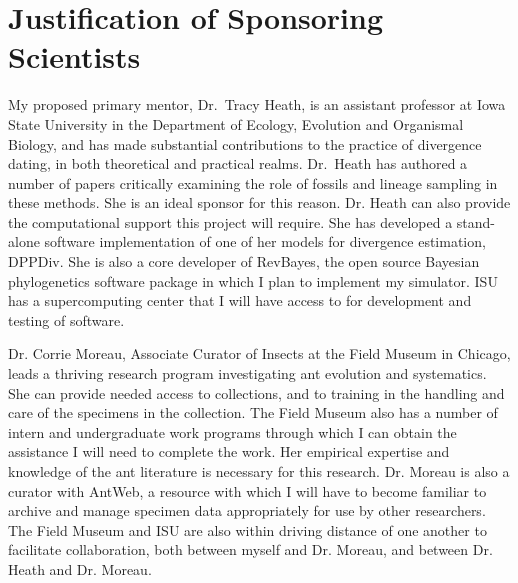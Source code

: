 \documentclass[]{article}
\begin{document}
\section*{Justification of Sponsoring Scientists}
    My proposed primary mentor, Dr.\ Tracy Heath, is an assistant professor at Iowa State University in the Department of Ecology, Evolution and Organismal Biology, and has made substantial contributions to the practice of divergence dating, in both theoretical and practical realms. Dr.\ Heath has authored a number of papers critically examining the role of fossils and lineage sampling in these methods. She is an ideal sponsor for this reason. Dr. Heath can also provide the computational support this project will require. She has developed a stand-alone software implementation of one of her models for divergence estimation, DPPDiv. She is also a core developer of RevBayes, the open source Bayesian phylogenetics software package in which I plan to implement my simulator. ISU has a supercomputing center that I will have access to for development and testing of software.  \par
Dr. Corrie Moreau, Associate Curator of Insects at the Field Museum in Chicago, leads a thriving research program investigating ant evolution and systematics. She can provide needed access to collections, and to training in the handling and care of the specimens in the collection.  The Field Museum also has a number of intern and undergraduate work programs through which I can obtain the assistance I will need to complete the work. Her empirical expertise and knowledge of the ant literature is necessary for this research.  Dr. Moreau is also a curator with AntWeb, a resource with which I will have to become familiar to archive and manage specimen data appropriately for use by other researchers. The Field Museum and ISU are also within driving distance of one another to facilitate collaboration, both between myself and Dr. Moreau, and between Dr. Heath and Dr. Moreau. \par
\end{document}
